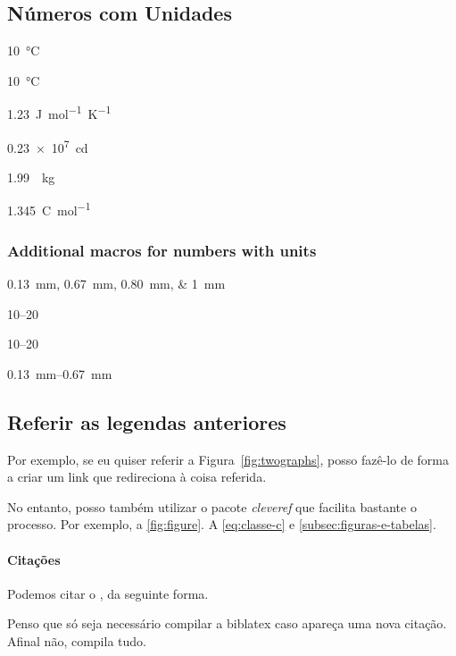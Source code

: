    \subsection*{Números com Unidades}

    \qty{10}{\celsius} \par
    \qty{10}{\degreeCelsius} \par
    \qty{1.23}{J.mol^{-1}.K^{-1}} \par
    \qty{.23e7}{\candela} \par
    \qty[per-mode = symbol]{1.99}{\per\kilogram} \par
    \qty[per-mode = fraction]{1,345}{\coulomb\per\mole}

    \pagebreak

    \subsubsection*{Additional macros for numbers with units}

    \qtylist{0.13;0.67;0.80;1}{\milli\metre}\par
     \par
     \par
    \numrange{10}{20} \par
    \numrange[range-phrase=--]{10}{20} \par
    \qtyrange{0.13}{0.67}{\milli\metre}

    \subsection{Referir as legendas anteriores}\label{subsec:reference}

    Por exemplo, se eu quiser referir a Figura~\ref{fig:twographs}, posso fazê-lo de forma a criar um link que redireciona à coisa referida.

    No entanto, posso também utilizar o pacote \emph{cleveref} que facilita bastante o processo.
    Por exemplo, a \cref{fig:figure}.
    A \cref{eq:classe-c} e \cref{subsec:figuras-e-tabelas}.

\paragraph{Citações} Podemos citar o \textcite{einstein}, da seguinte forma.

Penso que só seja necessário compilar a biblatex caso apareça uma nova citação.
Afinal não, compila tudo.